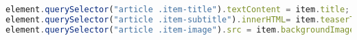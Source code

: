 \begin{lstlisting}[language= Javascript,caption=Das Einfügen von Titel\, Teasertext und Bild., label={lst:artikelinfos}]
element.querySelector("article .item-title").textContent = item.title;
element.querySelector("article .item-subtitle").innerHTML= item.teaserText;
element.querySelector("article .item-image").src = item.backgroundImage;
\end{lstlisting} 